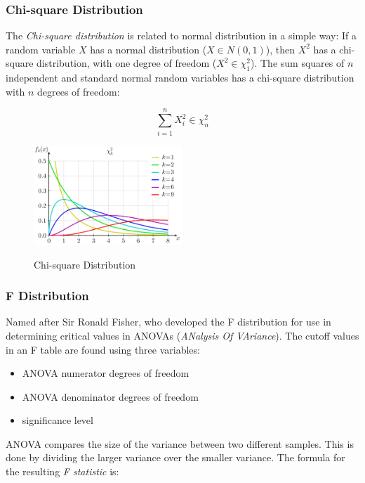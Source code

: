 \subsubsection{Chi-square Distribution}

The \emph{Chi-square distribution} is related to normal distribution in a simple way: If a random variable $X$ has a normal distribution ($X \in N(0,1)$), then $X^2$ has a chi-square distribution, with one degree of freedom ($X^2 \in \chi_{1}^2$). The sum squares of $n$ independent and standard normal random variables has a chi-square distribution with $n$ degrees of freedom:

\begin{equation}
    \sum\limits_{i = 1}^n {X_i^2} \in \chi_{n}^2
\end{equation}


\begin{figure}
  \centering
  \includegraphics[width=0.5\textwidth]{../Images/ChiSquare_pdf.png}\\
  \caption{Chi-square Distribution}
\end{figure}


\subsubsection{F Distribution}
Named after Sir Ronald Fisher, who developed the F distribution for use in determining critical values in ANOVAs (\emph{ANalysis Of VAriance}).  The cutoff values in an F table are found using three variables:

\begin{itemize}
  \item ANOVA numerator degrees of freedom
  \item ANOVA denominator degrees of freedom
  \item significance level
\end{itemize}

ANOVA compares the size of the variance between two different samples. This is done by dividing the larger variance over the smaller variance. The formula for the resulting \emph{F statistic} is:


